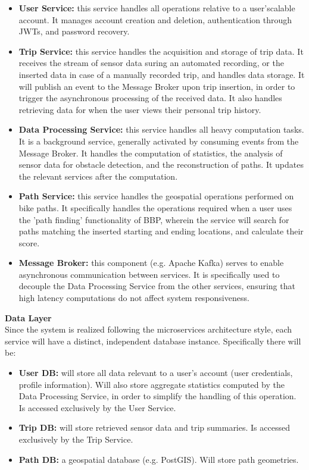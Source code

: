 \begin{itemize}
    \item \textbf{User Service:} this service handles all operations relative to a user'scalable
    account. It manages account creation and deletion, authentication through JWTs, and
    password recovery.
    \item \textbf{Trip Service:} this service handles the acquisition and storage of trip data. It
    receives the stream of sensor data suring an automated recording, or the inserted data
    in case of a manually recorded trip, and handles data storage. It will publish an event to the
    Message Broker upon trip insertion, in order to trigger the asynchronous processing of the
    received data. It also handles retrieving data for when the user views their personal
    trip history.
    \item \textbf{Data Processing Service:} this service handles all heavy computation tasks. It is
    a background service, generally activated by consuming events from the Message Broker. It handles
    the computation of statistics, the analysis of sensor data for obstacle detection, and the reconstruction
    of paths. It updates the relevant services after the computation.
    \item \textbf{Path Service:} this service handles the geospatial operations performed on bike paths.
    It specifically handles the operations required when a user uses the 'path finding' functionality of 
    BBP, wherein the service will search for paths matching the inserted starting and ending locations, and
    calculate their score.
    \item \textbf{Message Broker:} this component (e.g. Apache Kafka) serves to enable asynchronous 
    communication between services. It is specifically used to decouple the Data Processing Service from the 
    other services, ensuring that high latency computations do not affect system responsiveness.\\
\end{itemize}
\textbf{Data Layer}\\
Since the system is realized following the microservices architecture style, each service will have 
a distinct, independent database instance. Specifically there will be:
\begin{itemize}
    \item \textbf{User DB: } will store all data relevant to a user's account (user credentials, profile
    information). Will also store aggregate statistics computed by the Data Processing Service, in order to
    simplify the handling of this operation. Is accessed exclusively by the User Service.
    \item \textbf{Trip DB: } will store retrieved sensor data and trip summaries. Is accessed exclusively
    by the Trip Service.
    \item \textbf{Path DB: } a geospatial database (e.g. PostGIS). Will store path geometries.\\
\end{itemize}
